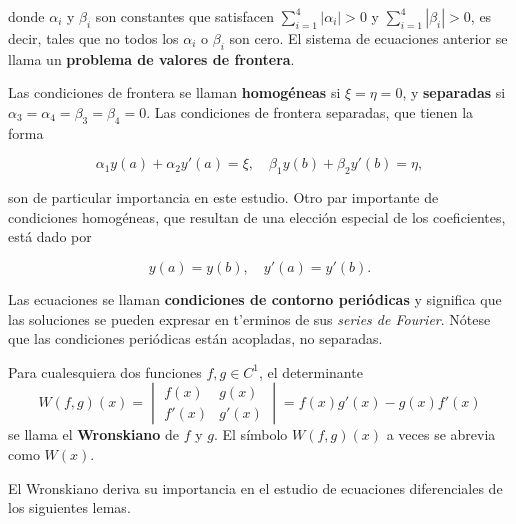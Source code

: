 \documentclass[main.tex]{subfiles}
\begin{document}
donde \(\alpha_i\) y \(\beta_i\) son constantes que satisfacen \(\sum_{i=1}^4|\alpha_i|>0\) y \(\sum_{i=1}^4|\beta_i|>0\), es decir, tales que no todos los \(\alpha_i\) o \(\beta_i\) son cero. El sistema de ecuaciones anterior se llama un \textbf{problema de valores de frontera}.

Las condiciones de frontera se llaman \textbf{homogéneas} si \(\xi=\eta=0\), y \textbf{separadas} si \(\alpha_3=\alpha_4=\beta_3=\beta_4=0\). Las condiciones de frontera separadas, que tienen la forma

\[
\alpha_1y(a)+\alpha_2y'(a)=\xi,\quad\beta_1y(b)+\beta_2y'(b)=\eta,
\]

son de particular importancia en este estudio. Otro par importante de condiciones homogéneas, que resultan de una elección especial de los coeficientes, está dado por

\[
y(a)=y(b),\quad y'(a)=y'(b).
\]

Las ecuaciones se llaman \textbf{condiciones de contorno periódicas} y significa que las soluciones se pueden expresar en t'erminos de sus \emph{series de Fourier}. Nótese que las condiciones periódicas están acopladas, no separadas.
\begin{def.}[Wronskiano]
Para cualesquiera dos funciones \(f,g\in C^1\), el determinante
\[
W(f, g)(x) = \begin{vmatrix}
f(x) & g(x) \\
f'(x) & g'(x)
\end{vmatrix} = f(x)g'(x) - g(x)f'(x)
\]
se llama el \textbf{Wronskiano} de \( f \) y \( g \). El símbolo \( W(f, g)(x) \) a veces se abrevia como \( W(x) \).
\end{def.}

El Wronskiano deriva su importancia en el estudio de ecuaciones diferenciales de los siguientes lemas.
\end{document}
